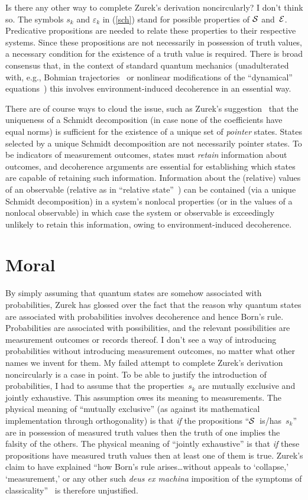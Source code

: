 \documentclass[12pt]{article}
\newcommand{\e}{\varepsilon}
\newcommand{\cS}{{\cal S}}
\newcommand{\E}{{\cal E}}
\begin{document}
Is there any other way to complete Zurek's derivation noncircularly? I don't think 
so. The symbols $s_k$ and $\e_k$ in (\ref{sch}) stand for possible properties of 
$\cS$ and~$\E$. Predicative propositions are needed to relate these properties 
to their respective systems. Since these propositions are not necessarily in 
possession of truth values, a necessary condition for the existence of a truth 
value is required. There is broad consensus that, in the context of standard 
quantum mechanics (unadulterated with, e.g., Bohmian 
trajectories~\cite{Bohm} or nonlinear modifications of the ``dynamical'' 
equations~\cite{GRW}) this involves environment-induced decoherence in an 
essential way.

There are of course ways to cloud the issue, such as Zurek's 
suggestion~\cite{ZurekEnv} that the uniqueness of a Schmidt decomposition (in 
case none of the coefficients have equal norms) is sufficient for the existence of a 
unique set of {\it pointer\/} states. States selected by a unique Schmidt 
decomposition are not necessarily pointer states. To be indicators of 
measurement outcomes, states must {\it retain\/} information about outcomes, 
and decoherence arguments are essential for establishing which states are 
capable of retaining such information. Information about the (relative) values of 
an observable (relative as in ``relative state''~\cite{ZurekRMP}) can be 
contained (via a unique Schmidt decomposition) in a system's nonlocal properties 
(or in the values of a nonlocal observable) in which case the system or observable 
is exceedingly unlikely to retain this information, owing to environment-induced 
decoherence.

\section{\large Moral}
By simply assuming that quantum states are somehow associated with 
probabilities, Zurek has glossed over the fact that the reason why quantum states 
are associated with probabilities involves decoherence and hence Born's rule. 
Probabilities are associated with possibilities, and the relevant possibilities are 
measurement outcomes or records thereof. I don't see a way of introducing 
probabilities without introducing measurement outcomes, no matter what other 
names we invent for them. My failed attempt to complete Zurek's derivation 
noncircularly is a case in point. To be able to justify the introduction of 
probabilities, I had to assume that the properties~$s_k$ are mutually exclusive 
and jointly exhaustive. This assumption owes its meaning to measurements. The 
physical meaning of ``mutually exclusive'' (as against its mathematical 
implementation through orthogonality) is that {\it if\/} the propositions 
``$\cS$~is/has~$s_k$'' are in possession of measured truth values then the 
truth of one implies the falsity of the others. The physical meaning of ``jointly 
exhaustive'' is that {\it if\/} these propositions have measured truth values then 
at least one of them is true. Zurek's claim to have explained ``how Born's rule 
arises\dots without appeals to `collapse,' `measurement,' or any other such {\it 
deus ex machina\/} imposition of the symptoms of 
classicality''~\cite{ZurekEnv} is therefore unjustified.
\end{document}
